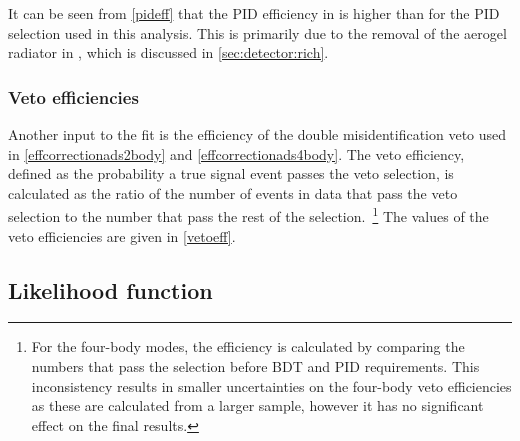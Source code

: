 It can be seen from \tab\ref{pideff} that the PID efficiency in \runtwo is higher than \runone for the PID selection used in this analysis. This is primarily due to the removal of the aerogel radiator in \runtwo, which is discussed in \sect\ref{sec:detector:rich}. 

\subsubsection{Veto efficiencies}
\label{sec:cpfit:efficiencies:veto}

Another input to the fit is the efficiency of the double misidentification veto used in \eqns\ref{effcorrectionads2body} and \ref{effcorrectionads4body}. The veto efficiency, defined as the probability a true signal event passes the veto selection, is calculated as the ratio of the number of events in data that pass the veto selection to the number that pass the rest of the selection.~\footnote{For the four-body modes, the efficiency is calculated by comparing the numbers that pass the selection before BDT and PID requirements. This inconsistency results in smaller uncertainties on the four-body veto efficiencies as these are calculated from a larger sample, however it has no significant effect on the final results.} The values of the veto efficiencies are given in \tab\ref{vetoeff}.

\begin{table}[h]
\centering
{}
\caption{Summary of the veto efficiencies used in the \CP fit.}
\label{vetoeff}
\end{table}


\subsection{Likelihood function}
\label{sec:cpfit:likelihood}

